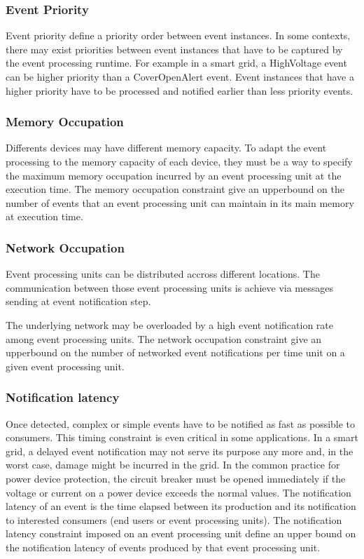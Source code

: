\documentclass[a4paper,twoside]{article}
\begin{document}
\subsubsection{Event Priority}
Event priority define a priority order between event instances. In some contexts, there may exist priorities between event instances that have to be captured by the event processing runtime. For example in a smart grid, a HighVoltage event can be higher priority than a CoverOpenAlert event. Event instances that have a higher priority have to be processed and notified earlier than less priority events. 
\subsubsection{Memory Occupation}
Differents devices may have different memory capacity. To adapt the event processing to the memory capacity of each device, they must be a way to specify the maximum memory occupation incurred by an event processing unit at the execution time. The memory occupation constraint give an upperbound on the number of events that an event processing unit can maintain in its main memory at execution time.
\subsubsection{Network Occupation}
Event processing units can be distributed accross different locations. The communication between those event processing units is achieve via messages sending at event notification step. 

The underlying network may be overloaded by a high event notification rate among event processing units.  
The network occupation constraint give an upperbound on the number of networked event notifications per time unit on a given event processing unit.  
\subsubsection{Notification latency}
Once detected, complex or simple events have to be notified as fast as possible to consumers. This timing constraint is even critical in some applications. In a smart grid, a delayed event notification may not serve its purpose any more and, in the worst case, damage might be incurred in the grid. In the common practice for power device protection, the circuit breaker must be opened immediately if the voltage or current on a power device exceeds the normal values. The notification latency of an event is the time elapsed between its production and its notification to interested consumers (end users or event processing units). The notification latency constraint imposed on an event processing unit define an upper bound on the notification latency of events produced by that event processing unit.
\end{document}
